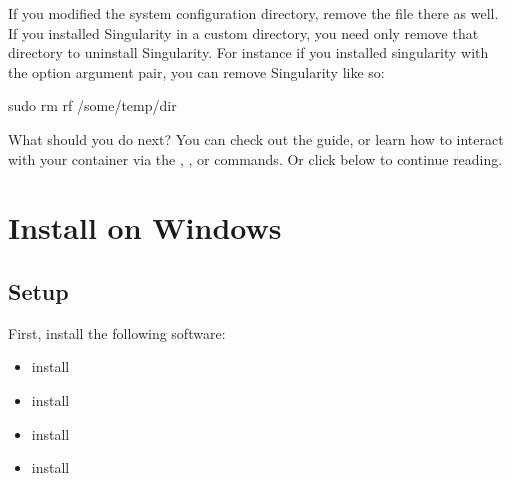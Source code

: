 \documentclass[letterpaper,10pt,english]{sphinxmanual}
\begin{document}
If you modified the system configuration directory, remove the  file
there as well.
If you installed Singularity in a custom directory, you need only
remove that directory to uninstall Singularity. For instance if you
installed singularity with the  option argument pair, you can remove
Singularity like so:

%
\begin{sphinxVerbatim}[commandchars=\\\{\}]
\PYGZdl{} sudo rm \PYGZhy{}rf /some/temp/dir
\end{sphinxVerbatim}

What should you do next? You can check out the {\hyperref[\detokenize{quick_start:quick-start}]{}} guide, or learn how to
interact with your container via the {\hyperref[\detokenize{appendix:shell-command}]{}} , {\hyperref[\detokenize{appendix:exec-command}]{}} , or {\hyperref[\detokenize{appendix:run-command}]{}} commands. Or click 
below to continue reading.


\section{Install on Windows}
\label{\detokenize{installation:install-on-windows}}

\subsection{Setup}
\label{\detokenize{installation:setup}}
First, install the following software:
\begin{itemize}
\item {} 
install 

\item {} 
install 

\item {} 
install 

\item {} 
install 

\end{itemize}
\end{document}
